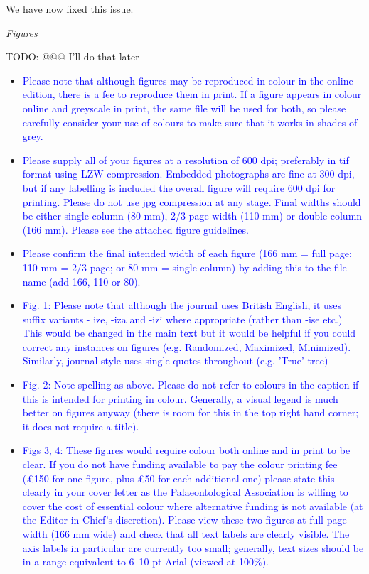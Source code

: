 \documentclass[12pt,letterpaper]{article}
\renewcommand{\subsection}[1]{%
\bigskip
\begin{center}
\begin{large}
\normalfont\itshape #1
\end{large}
\end{center}}
\begin{document}
We have now fixed this issue.

\subsection{Figures}

TODO: @@@ I'll do that later

\begin{itemize}
\item{\textcolor{blue}{Please note that although figures may be reproduced in colour in the online edition, there is a fee to reproduce them in print. If a figure appears in colour online and greyscale in print, the same file will be used for both, so please carefully consider your use of colours to make sure that it works in shades of grey.}}
\item{\textcolor{blue}{Please supply all of your figures at a resolution of 600 dpi; preferably in tif format using LZW compression. Embedded photographs are fine at 300 dpi, but if any labelling is included the overall figure will require 600 dpi for printing. Please do not use jpg compression at any stage. Final widths should be either single column (80 mm), 2/3 page width (110 mm) or double column (166 mm). Please see the attached figure
guidelines.}}
\item{\textcolor{blue}{Please confirm the final intended width of each figure (166 mm = full page; 110 mm = 2/3 page; or 80 mm = single column) by adding this to the file name (add 166, 110 or 80).}}
\item{\textcolor{blue}{Fig. 1: Please note that although the journal uses British English, it uses suffix variants - ize, -iza and -izi where appropriate (rather than -ise etc.) This would be changed in the main text but it would be helpful if you could correct any instances on figures (e.g. Randomized, Maximized, Minimized). Similarly, journal style uses single quotes throughout (e.g. 'True' tree)}}
\item{\textcolor{blue}{Fig. 2: Note spelling as above. Please do not refer to colours in the caption if this is intended for printing in colour. Generally, a visual legend is much better on figures anyway (there is room for this in the top right hand corner; it does not require a title).}}
\item{\textcolor{blue}{Figs 3, 4: These figures would require colour both online and in print to be clear. If you do not have funding available to pay the colour printing fee (£150 for one figure, plus £50 for each additional one) please state this clearly in your cover letter as the Palaeontological Association is willing to cover the cost of essential colour where alternative funding is not available (at the Editor-in-Chief's discretion). Please view these two figures at full page width (166 mm wide) and check that all text labels are clearly visible. The axis labels in particular are currently too small; generally, text sizes should be in a range equivalent to 6–10 pt Arial (viewed at 100\%).}}
\end{itemize}
\end{document}
